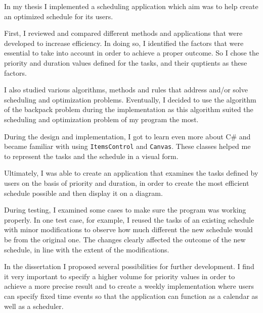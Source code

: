 In my thesis I implemented a scheduling application which aim was to help create an optimized schedule for its users.

First, I reviewed and compared different methods and applications that were developed to increase efficiency. In doing so, I identified the factors that were essential to take into account in order to achieve a proper outcome. So I chose the priority and duration values defined for the tasks, and their quptients as these factors.

I also studied various algorithms, methods and rules that address and/or solve scheduling and optimization problems. Eventually, I decided to use the algorithm of the backpack problem during the implementation as this algorithm suited the scheduling and optimization problem of my program the most.

During the design and implementation, I got to learn even more about C\# and became familiar with using \texttt{ItemsControl} and \texttt{Canvas}. These classes helped me to represent the tasks and the schedule in a visual form.

Ultimately, I was able to create an application that examines the tasks defined by users on the basis of priority and duration, in order to create the most efficient schedule possible and then display it on a diagram.

During testing, I examined some cases to make sure the program was working properly. In one test case, for example, I reused the tasks of an existing schedule with minor modifications to observe how much different the new schedule would be from the original one. The changes clearly affected the outcome of the new schedule, in line with the extent of the modifications.

In the dissertation I proposed several possibilities for further development. I find it very important to specify a higher volume for priority values in order to achieve a more precise result and to create a weekly implementation where users can specify fixed time events so that the application can function as a calendar as well as a scheduler.
